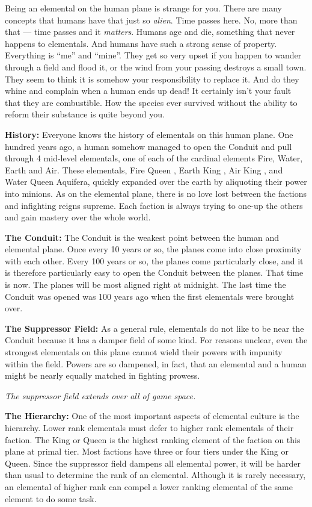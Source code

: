 \documentclass[blue]{elementals}
\begin{document}
\name{\bElemental{}}

Being an elemental on the human plane is strange for you. There are many concepts that humans have that just so \emph{alien}. Time passes here. No, more than that --- time passes and it \emph{matters}. Humans age and die, something that never happens to elementals. And humans have such a strong sense of property. Everything is ``me'' and ``mine''.  They get so very upset if you happen to wander through a field and flood it, or the wind from your passing destroys a small town. They seem to think it is somehow your responsibility to replace it. And do they whine and complain when a human ends up dead! It certainly isn't your fault that they are combustible. How the species ever survived without the ability to reform their substance is quite beyond you.

{\bf History:}
Everyone knows the history of elementals on this human plane. One hundred years ago, a human somehow managed to open the Conduit and pull through 4 mid-level elementals, one of each of the cardinal elements Fire, Water, Earth and Air. These elementals, Fire Queen \cQueen{}, Earth King \cEarthKing{}, Air King \cKing{}, and Water Queen Aquifera,  quickly expanded over the earth by aliquoting their power into minions. As on the elemental plane, there is no love lost between the factions and infighting reigns supreme. Each faction is always trying to one-up the others and gain mastery over the whole world.

{\bf The Conduit:}
The Conduit is the weakest point between the human and elemental plane. Once every 10 years or so, the planes come into close proximity with each other. Every 100 years or so, the planes come particularly close, and it is therefore particularly easy to open the Conduit between the planes. That time is now. The planes will be most aligned right at midnight. The last time the Conduit was opened was 100 years ago when the first elementals were brought over.

{\bf The Suppressor Field:}
As a general rule, elementals do not like to be near the Conduit because it has a damper field of some kind. For reasons unclear, even the strongest elementals on this plane cannot wield their powers with impunity within the field. Powers are so dampened, in fact, that an elemental and a human might be nearly equally matched in fighting prowess.

\emph{The suppressor field extends over all of game space.}

{\bf The Hierarchy:}
One of the most important aspects of elemental culture is the hierarchy. Lower rank elementals must defer to higher rank elementals of their faction. The King or Queen is the highest ranking element of the faction on this plane at primal tier. Most factions have three or four tiers under the King or Queen.  Since the suppressor field dampens all elemental power, it will be harder than usual to determine the rank of an elemental. Although it is rarely necessary, an elemental of higher rank can compel a lower ranking elemental of the same element to do some task.
\end{document}
